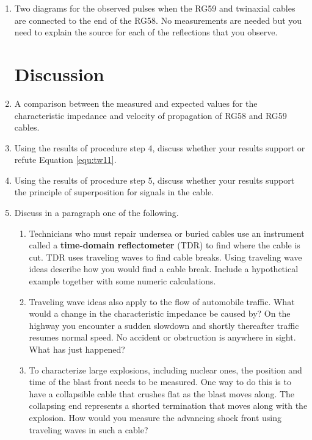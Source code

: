 \begin{enumerate}[resume]
\item Two diagrams for the observed pulses when the RG59 and twinaxial cables are connected to the end of the RG58. No measurements are needed but you need to explain the source for each of the reflections that you observe. 

\section{Discussion}

\item A comparison between the measured and expected values for the characteristic impedance and velocity of propagation of RG58 and RG59 cables.

\item Using the results of procedure step 4, discuss whether your results support or refute Equation \ref{equ:tw11}. 

\item Using the results of procedure step 5, discuss whether your results support the principle of superposition for signals in the cable.

\item Discuss in a paragraph one of the following.

\begin{enumerate}[label=\Alph*)]

\item Technicians who must repair undersea or buried cables use an instrument called a {\bf time-domain reflectometer} (TDR) to find where the cable is cut. TDR uses traveling waves to find cable breaks. Using traveling wave ideas describe how you would find a cable break. Include a hypothetical example together with some numeric calculations.

\item Traveling wave ideas also apply to the flow of automobile traffic. What would a change in the characteristic impedance be caused by? On the highway you encounter a sudden slowdown and shortly thereafter traffic resumes normal speed. No accident or obstruction is anywhere in sight. What has just happened?

\item To characterize large explosions, including nuclear ones, the position and time of the blast front needs to be measured. One way to do this is to have a collapsible cable that crushes flat as the blast moves along. The collapsing end represents a shorted termination that moves along with the explosion. How would you measure the advancing shock front using traveling waves in such a cable?

\end{enumerate}
\end{enumerate}




